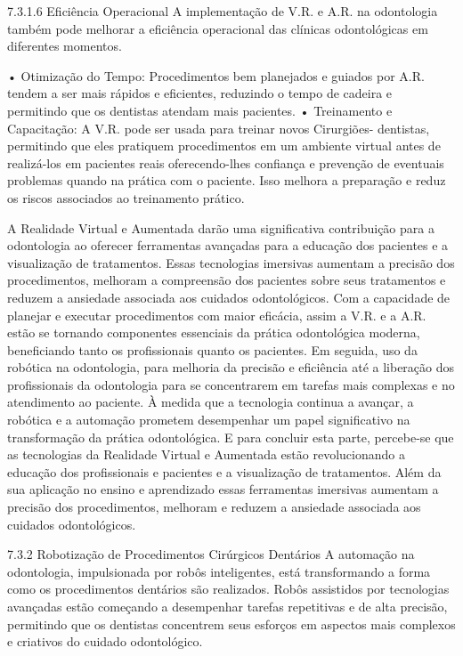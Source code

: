 7.3.1.6   Eficiência Operacional
A implementação de V.R. e A.R. na odontologia também pode melhorar a eficiência
operacional das clínicas odontológicas em diferentes momentos.

    • Otimização do Tempo: Procedimentos bem planejados e guiados por A.R.
      tendem a ser mais rápidos e eficientes, reduzindo o tempo de cadeira e permitindo
      que os dentistas atendam mais pacientes.
    • Treinamento e Capacitação: A V.R. pode ser usada para treinar novos Cirurgiões-
      dentistas, permitindo que eles pratiquem procedimentos em um ambiente virtual
      antes de realizá-los em pacientes reais oferecendo-lhes confiança e prevenção
      de eventuais problemas quando na prática com o paciente. Isso melhora a
      preparação e reduz os riscos associados ao treinamento prático.

         A Realidade Virtual e Aumentada darão uma significativa contribuição para a
odontologia ao oferecer ferramentas avançadas para a educação dos pacientes e a
visualização de tratamentos. Essas tecnologias imersivas aumentam a precisão dos
procedimentos, melhoram a compreensão dos pacientes sobre seus tratamentos e
reduzem a ansiedade associada aos cuidados odontológicos. Com a capacidade de
planejar e executar procedimentos com maior eficácia, assim a V.R. e a A.R. estão se
tornando componentes essenciais da prática odontológica moderna, beneficiando tanto
os profissionais quanto os pacientes.
         Em seguida, uso da robótica na odontologia, para melhoria da precisão e
eficiência até a liberação dos profissionais da odontologia para se concentrarem em
tarefas mais complexas e no atendimento ao paciente. À medida que a tecnologia
continua a avançar, a robótica e a automação prometem desempenhar um papel
significativo na transformação da prática odontológica.
        E para concluir esta parte, percebe-se que as tecnologias da Realidade Virtual
e Aumentada estão revolucionando a educação dos profissionais e pacientes e a
visualização de tratamentos. Além da sua aplicação no ensino e aprendizado essas
ferramentas imersivas aumentam a precisão dos procedimentos, melhoram e reduzem
a ansiedade associada aos cuidados odontológicos.

7.3.2     Robotização de Procedimentos Cirúrgicos Dentários
A automação na odontologia, impulsionada por robôs inteligentes, está transformando
a forma como os procedimentos dentários são realizados. Robôs assistidos por
tecnologias avançadas estão começando a desempenhar tarefas repetitivas e de alta
precisão, permitindo que os dentistas concentrem seus esforços em aspectos mais
complexos e criativos do cuidado odontológico.

